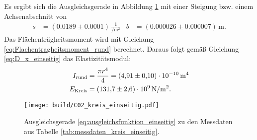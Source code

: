 \noindent
Es ergibt sich die Ausgleichsgerade in Abbildung \ref{fig:plot_kreis_einseitig}
mit einer Steigung bzw. einem Achsenabschnitt von 
\begin{align*}
    s &= (\num{0.0189} \pm \num{0.0001}) \, \frac{1}{\unit{\per\meter^2}} & b &= (\num{0.000026} \pm \num{0.000007}) \, \unit{\meter}.
\end{align*}
Das Flächenträgheitsmoment wird mit Gleichung \eqref{eq:Flachentragheitsmoment_rund} berechnet.
Daraus folgt gemäß Gleichung \eqref{eq:D_x_einseitig} das Elastizitätsmodul:
\begin{align}
    I_\text{rund} &= \frac{\pi r^4}{4} = \qty{4.91 +- 0.10 e-10}{\meter\tothe{4}}\nonumber\\
    E_\text{Kreis} &= (\num{131.7} \pm \num{2.6}) \cdot 10^9 \, \unit{\newton\per\meter^2}.
\end{align}

\begin{figure}[H]
    \centering
    \texttt{[image: build/C02\_kreis\_einseitig.pdf]}
    \caption{Ausgleichsgerade \eqref{eq:ausgleichsfunktion_einseitig} zu den Messdaten aus Tabelle \ref{tab:messdaten_kreis_einseitig}.}
    \label{fig:plot_kreis_einseitig}
\end{figure}
